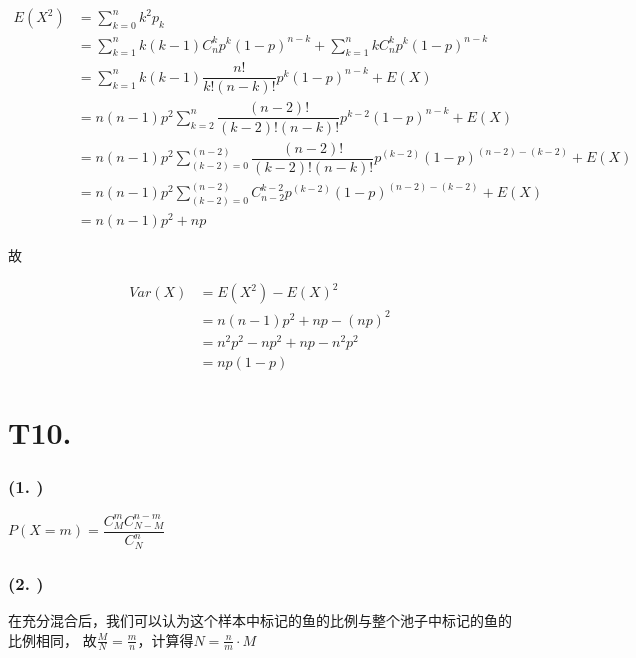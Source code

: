 \documentclass{article}
\newcommand\f[2]{\frac{#1}{#2}}
\newcommand\df[2]{\dfrac{#1}{#2}}
\begin{document}
\begin{equation}
    \begin{aligned}
        E(X^2)
        & = \sum_{k=0}^{n}k^2p_k\\
        & = \sum_{k=1}^{n}k(k-1)C_n^kp^k(1-p)^{n-k}+\sum_{k=1}^{n}kC_n^kp^k(1-p)^{n-k}\\
        & = \sum_{k=1}^{n}k(k-1)\df{n!}{k!(n-k)!}p^k(1-p)^{n-k}+E(X)\\
        & = n(n-1)p^2\sum_{k=2}^{n}\df{(n-2)!}{(k-2)!(n-k)!}p^{k-2}(1-p)^{n-k}+E(X)\\
        & = n(n-1)p^2\sum_{(k-2)=0}^{(n-2)}\df{(n-2)!}{(k-2)!(n-k)!}p^{(k-2)}(1-p)^{(n-2)-(k-2)}+E(X)\\
        & = n(n-1)p^2\sum_{(k-2)=0}^{(n-2)}C_{n-2}^{k-2}p^{(k-2)}(1-p)^{(n-2)-(k-2)}+E(X)\\
        & = n(n-1)p^2+np
    \end{aligned}
\end{equation}

故

\begin{equation}
    \begin{aligned}
        Var(X)
        & = E(X^2)-E(X)^2\\
        & = n(n-1)p^2+np-(np)^2\\
        & = n^2p^2-np^2+np-n^2p^2\\
        & = np(1-p)
    \end{aligned}
\end{equation}

\section*{T10. }

\subsubsection*{(1. )}

$P(X=m)=\df{C_M^m C_{N-M}^{n-m}}{C_N^n}$

\subsubsection*{(2. )}

在充分混合后，我们可以认为这个样本中标记的鱼的比例与整个池子中标记的鱼的比例相同，
故$\f{M}{N}=\f{m}{n}$，计算得$N=\f{n}{m}\cdot M$
\end{document}
